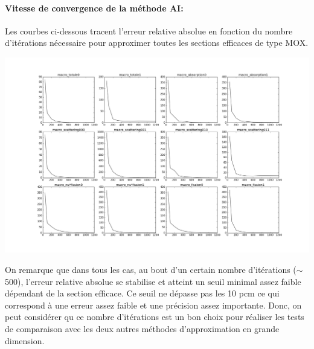 \newpage
\clearpage

\paragraph{Vitesse de convergence de la méthode AI:\\}
\hspace{0.5cm}
Les courbes ci-dessous tracent l'erreur relative absolue en fonction du nombre d'itérations nécessaire pour approximer toutes les sections efficaces de type MOX.
\begin{center}
\includegraphics[height= 9 cm,width = \linewidth]{images/MOX/Convergence_speed.png}
\end{center}
\hspace{0.5cm} On remarque que dans tous les cas, au bout d'un certain nombre d'itérations ($\sim$ 500), l'erreur relative absolue se stabilise et atteint un seuil minimal assez faible dépendant de la section efficace. Ce seuil ne dépasse pas les 10 pcm ce qui correspond à une erreur assez faible et une précision assez importante. Donc, on peut considérer qu ce nombre d'itérations est un bon choix pour réaliser les tests de comparaison avec les deux autres méthodes d'approximation en grande dimension.

